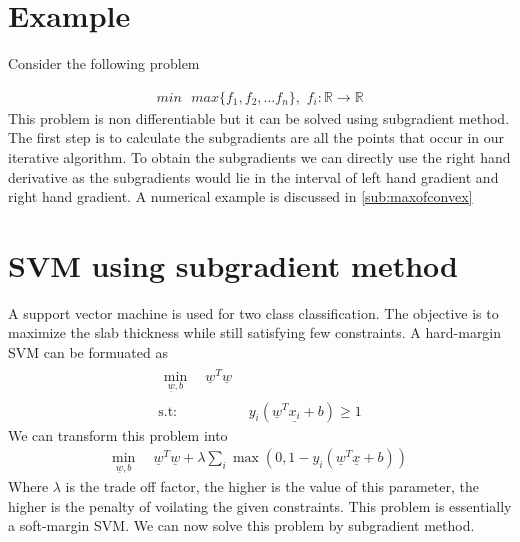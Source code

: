 \documentclass[twoside,twocolumn]{article}
\renewcommand{\vec}[1]{\underline{#1}}
\newcommand\twospace{\,\,}
\newcommand\fourspace{\,\,\,\,}
\newcommand\norm[1]{\ensuremath{\lVert#1\rVert_2}}
\begin{document}
\section{Example}
Consider the following problem

\begin{align}
    min\fourspace max\{f_1,f_2,\dots f_n\},\twospace f_i : \mathbb{R} \to \mathbb{R}
\end{align}
This problem is non differentiable but it can be solved using subgradient method. The first step is to calculate the subgradients are all the points that occur in our iterative algorithm. To obtain the subgradients we can directly use the right hand derivative as the subgradients would lie in the interval of left hand gradient and right hand gradient. A numerical example is discussed in \eqref{sub:maxofconvex} 



\section{SVM using subgradient method}\label{sec:svm}
A support vector machine is used for two class classification. The objective is to maximize the slab thickness while still satisfying  few constraints. A hard-margin SVM can be formuated as
\begin{align}
    \begin{split}
        \min_{\vec{w},b}\, &\twospace\vec{w}^T\vec{w}
    \end{split}\\ 
    \text{s.t:}
    \twospace & y_i(\vec{w}^T\vec{x_i}+b)\geq 1
\end{align}
We can transform this problem into
\begin{align}
    \min_{\vec{w},b}\, &\twospace\vec{w}^T\vec{w} + \lambda \sum_i \max\left(0, 1-y_i\left(\vec{w}^T\vec{x}+b\right)\right)
\end{align}
Where $\lambda$ is the trade off factor, the higher is the value of this parameter, the higher is the penalty of voilating the given constraints. This problem is essentially a soft-margin SVM. We can now solve this problem by subgradient method.
\end{document}
